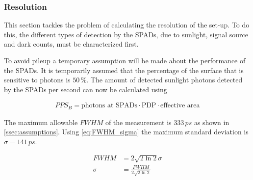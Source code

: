 \subsubsection{Resolution} 
\label{sssec:resolution}
This section tackles the problem of calculating the resolution of the set-up. To do this, the different types of detection by the SPADs, due to sunlight, signal source and dark counts, must be characterized first.

To avoid pileup a temporary assumption will be made about the performance of the SPADs. It is temporarily assumed that the percentage of the surface that is sensitive to photons is $50\,\%$. The amount of detected sunlight photons detected by the SPADs per second can now be calculated using

\begin{align}\label{eq:PPS_B}
PPS_B = \text{photons at SPADs}\cdot \text{PDP} \cdot \text{effective area}
\end{align}






The maximum allowable $FWHM$ of the measurement is $333\,ps$ as shown in \cref{ssec:assumptions}. Using \cref{eq:FWHM_sigma} the maximum standard deviation is $\sigma=141\,ps$.

\begin{align}\label{eq:sigma_FWHM}
	FWHM   &= 2\sqrt{2\ln2}\sigma \\
	\sigma &= \frac{FWHM}{2\sqrt{2\ln2}}\label{eq:FWHM_sigma}
\end{align}
